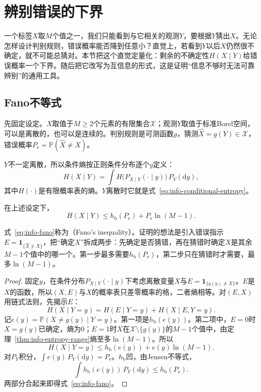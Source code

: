 \section{辨别错误的下界}
\label{sec:info-fano}

一个标签$X$取$M$个值之一，我们只能看到与它相关的观测$Y$，要根据$Y$猜出$X$。无论怎样设计判别规则，错误概率能否降到任意小？直觉上，若看到$Y$以后$X$仍然很不确定，就不可能总猜对。本节把这个直觉定量化：剩余的不确定性$H(X\mid Y)$给错误概率一个下界。随后把它改写为互信息的形式，这是证明“信息不够时无法可靠辨别”的通用工具。

\subsection{Fano不等式}
\label{sec:info-fano-inequality}

先固定设定。$X$取值于$M\geq2$个元素的有限集合$\mathcal{X}$；观测$Y$取值于标准Borel空间，可以是离散的，也可以是连续的。判别规则是可测函数$g$，猜测$\hat{X}=g(Y)\in\mathcal{X}$，错误概率$P_{\mathrm{e}}=\mathbb{P}(\hat{X}\neq X)$。

$Y$不一定离散，所以条件熵按正则条件分布逐个$y$定义：
\[
  H(X\mid Y)=\int H\bigl(P_{X\mid Y}(\cdot\mid y)\bigr)\,P_Y(\mathrm{d}y),
\]
其中$H(\cdot)$是有限概率表的熵。$Y$离散时它就是式~\eqref{eq:info-conditional-entropy}。

\begin{theorem}[Fano不等式]
\label{thm:info-fano}
在上述设定下，
\begin{equation}
  H(X\mid Y)\leq h_{\mathrm{b}}(P_{\mathrm{e}})+P_{\mathrm{e}}\ln(M-1).
  \label{eq:info-fano}
\end{equation}
\end{theorem}

式~\eqref{eq:info-fano}称为（Fano's inequality）。证明的想法是引入错误指示$E=\mathbf{1}_{\{\hat{X}\neq X\}}$，把“确定$X$”拆成两步：先确定是否猜错，再在猜错时确定$X$是其余$M-1$个值中的哪一个。第一步最多需要$h_{\mathrm{b}}(P_{\mathrm{e}})$，第二步只在猜错时才需要，最多$\ln(M-1)$。

\begin{proof}
固定$y$，在条件分布$P_{X\mid Y}(\cdot\mid y)$下考虑离散变量$X$与$E=\mathbf{1}_{\{g(y)\neq X\}}$。$E$是$X$的函数，所以$(X,E)$与$X$的概率表只差零概率的格，二者熵相等。对$(E,X)$用链式法则，先揭示$E$：
\[
  H(X\mid Y=y)=H(E\mid Y=y)+H(X\mid E,Y=y).
\]
记$e(y)=\mathbb{P}(X\neq g(y)\mid Y=y)$。第一项是$h_{\mathrm{b}}(e(y))$。第二项中，$E=0$时$X=g(y)$已确定，熵为$0$；$E=1$时$X$在$\mathcal{X}\setminus\{g(y)\}$的$M-1$个值中，由定理~\ref{thm:info-entropy-range}熵至多$\ln(M-1)$。所以
\[
  H(X\mid Y=y)\leq h_{\mathrm{b}}(e(y))+e(y)\ln(M-1).
\]
对$P_Y$积分，$\int e(y)\,P_Y(\mathrm{d}y)=P_{\mathrm{e}}$。$h_{\mathrm{b}}$凹，由Jensen不等式，
\[
  \int h_{\mathrm{b}}(e(y))\,P_Y(\mathrm{d}y)\leq h_{\mathrm{b}}(P_{\mathrm{e}}).
\]
两部分合起来即得式~\eqref{eq:info-fano}。
\end{proof}

